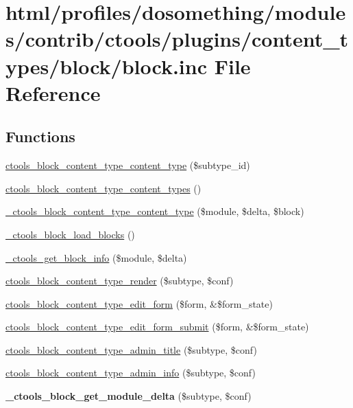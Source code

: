 \hypertarget{block_8inc}{
\section{html/profiles/dosomething/modules/contrib/ctools/plugins/content\_\-types/block/block.inc File Reference}
\label{block_8inc}
}
\subsection*{Functions}
\begin{DoxyCompactItemize}
\item 
\hyperlink{block_8inc_a4c1c8dd8b4c59a7efa78259046cda6b4}{ctools\_\-block\_\-content\_\-type\_\-content\_\-type} (\$subtype\_\-id)
\item 
\hyperlink{block_8inc_a6cae46520409860530d99f4eebf4305b}{ctools\_\-block\_\-content\_\-type\_\-content\_\-types} ()
\item 
\hyperlink{block_8inc_a28496d861d9c2b82fe8288a30ba97312}{\_\-ctools\_\-block\_\-content\_\-type\_\-content\_\-type} (\$module, \$delta, \$block)
\item 
\hyperlink{block_8inc_ab02ec538c54a12376c3704ec2b6cddb8}{\_\-ctools\_\-block\_\-load\_\-blocks} ()
\item 
\hyperlink{block_8inc_a07ccb689401785f6c61bfde2d35ec58c}{\_\-ctools\_\-get\_\-block\_\-info} (\$module, \$delta)
\item 
\hyperlink{block_8inc_ae59c8b95fd7a929577b25a09a67841e8}{ctools\_\-block\_\-content\_\-type\_\-render} (\$subtype, \$conf)
\item 
\hyperlink{block_8inc_a3d85f91ceefbd673b09278f045e0f9ec}{ctools\_\-block\_\-content\_\-type\_\-edit\_\-form} (\$form, \&\$form\_\-state)
\item 
\hyperlink{block_8inc_ad001208c265600dc08420e74250af638}{ctools\_\-block\_\-content\_\-type\_\-edit\_\-form\_\-submit} (\$form, \&\$form\_\-state)
\item 
\hyperlink{block_8inc_a29fbadd37d2baf2e9481c9b641d90a1b}{ctools\_\-block\_\-content\_\-type\_\-admin\_\-title} (\$subtype, \$conf)
\item 
\hyperlink{block_8inc_a1171315f05fb634e86d24b39da3dfa8f}{ctools\_\-block\_\-content\_\-type\_\-admin\_\-info} (\$subtype, \$conf)
\item 
\hypertarget{block_8inc_a4652f93169bd56824b96e90452593d32}{
{\bfseries \_\-ctools\_\-block\_\-get\_\-module\_\-delta} (\$subtype, \$conf)}
\label{block_8inc_a4652f93169bd56824b96e90452593d32}


\end{DoxyCompactItemize}
